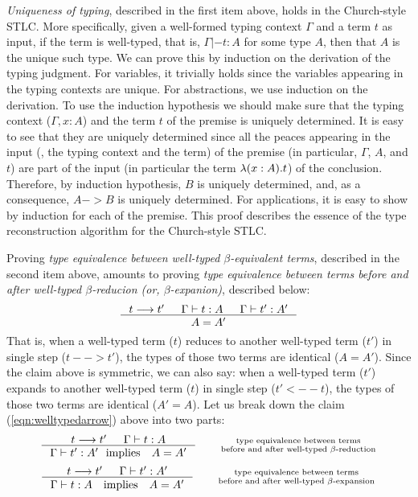 \emph{Uniqueness of typing}, described in the first item above,
holds in the Church-style STLC.  More specifically, given
a well-formed typing context $\Gamma$ and a term $t$ as input,
if the term is well-typed, that is, $\Gamma |- t : A$ for some type $A$,
then that $A$ is the unique such type. We can prove this by induction on
the derivation of the typing judgment.
For variables, it trivially holds since the variables appearing in
the typing contexts are unique.
For abstractions, we use induction on the derivation.
To use the induction hypothesis we should make sure that
the typing context ($\Gamma,x:A$) and the term $t$ of the premise
is uniquely determined. It is easy to see that they are uniquely determined
since all the peaces appearing in the input (\ie, the typing context and
the term) of the premise (in particular, $\Gamma$, $A$, and $t$) are
part of the input (in particular the term $\lambda(x:A).t$) of the conclusion.
Therefore, by induction hypothesis, $B$ is uniquely determined, and,
as a consequence, $A -> B$ is uniquely determined.
For applications, it is easy to show by induction for each of the premise.
This proof describes the essence of the type reconstruction algorithm for
the Church-style STLC.


Proving \emph{type equivalence between well-typed $\beta$-equivalent terms},
described in the second item above, amounts to proving \emph{type equivalence
between terms before and after well-typed $\beta$-reducion
(or, $\beta$-expanion)},
described below:
\begin{align}
\inference{t --> t' & \Gamma |- t : A & \Gamma |- t' : A'}{A = A'}
	\label{eqn:welltypedarrow}
\end{align}
That is, when a well-typed term ($t$) reduces to
another well-typed term ($t'$) in single step ($t --> t'$),
the types of those two terms are identical ($A=A'$).
Since the claim above is symmetric, we can also say: when a well-typed term
($t'$) expands to another well-typed term ($t$) in single step ($t' <-- t$),
the types of those two terms are identical ($A'=A$).
Let us break down the claim (\ref{eqn:welltypedarrow}) above into two parts:
\[
\inference{t --> t' & \Gamma |- t : A}
          {\Gamma |- t' : A' ~~\text{implies}\quad A = A'} \qquad
	\begin{smallmatrix}
		\text{type equivalence between terms} \\
  		\text{before and after well-typed $\beta$-reduction}
	\end{smallmatrix}
\]
\[
\inference{t --> t' & \Gamma |- t' : A'}
          {\Gamma |- t : A \quad\text{implies}\quad A = A'} \qquad
	\begin{smallmatrix}
		\text{type equivalence between terms} \\
  		\text{before and after well-typed $\beta$-expansion}
	\end{smallmatrix}
\]~\vspace*{-3em}\\


